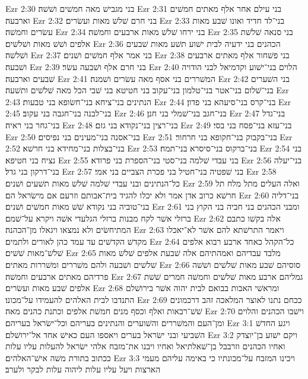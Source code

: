 Ezr 2:30  בני מגבישׁ מאה חמשׁים ושׁשׁה׃
Ezr 2:31  בני עילם אחר אלף מאתים חמשׁים וארבעה׃
Ezr 2:32  בני חרם שׁלשׁ מאות ועשׂרים׃
Ezr 2:33  בני־לד חדיד ואונו שׁבע מאות עשׂרים וחמשׁה׃
Ezr 2:34  בני ירחו שׁלשׁ מאות ארבעים וחמשׁה׃
Ezr 2:35  בני סנאה שׁלשׁת אלפים ושׁשׁ מאות ושׁלשׁים׃
Ezr 2:36  הכהנים בני ידעיה לבית ישׁוע תשׁע מאות שׁבעים ושׁלשׁה׃
Ezr 2:37  בני אמר אלף חמשׁים ושׁנים׃
Ezr 2:38  בני פשׁחור אלף מאתים ארבעים ושׁבעה׃
Ezr 2:39  בני חרם אלף ושׁבעה עשׂר׃
Ezr 2:40  הלוים בני־ישׁוע וקדמיאל לבני הודויה שׁבעים וארבעה׃
Ezr 2:41  המשׁררים בני אסף מאה עשׂרים ושׁמנה׃
Ezr 2:42  בני השׁערים בני־שׁלום בני־אטר בני־טלמון בני־עקוב בני חטיטא בני שׁבי הכל מאה שׁלשׁים ותשׁעה׃
Ezr 2:43  הנתינים בני־ציחא בני־חשׂופא בני טבעות׃
Ezr 2:44  בני־קרס בני־סיעהא בני פדון׃
Ezr 2:45  בני־לבנה בני־חגבה בני עקוב׃
Ezr 2:46  בני־חגב בני־שׁמלי בני חנן׃
Ezr 2:47  בני־גדל בני־גחר בני ראיה׃
Ezr 2:48  בני־רצין בני־נקודא בני גזם׃
Ezr 2:49  בני־עזא בני־פסח בני בסי׃
Ezr 2:50  בני־אסנה בני־מעינים בני נפיסים׃
Ezr 2:51  בני־בקבוק בני־חקופא בני חרחור׃
Ezr 2:52  בני־בצלות בני־מחידא בני חרשׁא׃
Ezr 2:53  בני־ברקוס בני־סיסרא בני־תמח׃
Ezr 2:54  בני נציח בני חטיפא׃
Ezr 2:55  בני עבדי שׁלמה בני־סטי בני־הספרת בני פרודא׃
Ezr 2:56  בני־יעלה בני־דרקון בני גדל׃
Ezr 2:57  בני שׁפטיה בני־חטיל בני פכרת הצביים בני אמי׃
Ezr 2:58  כל־הנתינים ובני עבדי שׁלמה שׁלשׁ מאות תשׁעים ושׁנים׃
Ezr 2:59  ואלה העלים מתל מלח תל חרשׁא כרוב אדן אמר ולא יכלו להגיד בית־אבותם וזרעם אם מישׂראל הם׃
Ezr 2:60  בני־דליה בני־טוביה בני נקודא שׁשׁ מאות חמשׁים ושׁנים׃
Ezr 2:61  ומבני הכהנים בני חביה בני הקוץ בני ברזלי אשׁר לקח מבנות ברזלי הגלעדי אשׁה ויקרא על־שׁמם׃
Ezr 2:62  אלה בקשׁו כתבם המתיחשׂים ולא נמצאו ויגאלו מן־הכהנה׃
Ezr 2:63  ויאמר התרשׁתא להם אשׁר לא־יאכלו מקדשׁ הקדשׁים עד עמד כהן לאורים ולתמים׃
Ezr 2:64  כל־הקהל כאחד ארבע רבוא אלפים שׁלשׁ־מאות שׁשׁים׃
Ezr 2:65  מלבד עבדיהם ואמהתיהם אלה שׁבעת אלפים שׁלשׁ מאות שׁלשׁים ושׁבעה ולהם משׁררים ומשׁררות מאתים׃
Ezr 2:66  סוסיהם שׁבע מאות שׁלשׁים ושׁשׁה פרדיהם מאתים ארבעים וחמשׁה׃
Ezr 2:67  גמליהם ארבע מאות שׁלשׁים וחמשׁה חמרים שׁשׁת אלפים שׁבע מאות ועשׂרים׃
Ezr 2:68  ומראשׁי האבות בבואם לבית יהוה אשׁר בירושׁלם התנדבו לבית האלהים להעמידו על־מכונו׃
Ezr 2:69  ככחם נתנו לאוצר המלאכה זהב דרכמונים שׁשׁ־רבאות ואלף וכסף מנים חמשׁת אלפים וכתנת כהנים מאה׃
Ezr 2:70  וישׁבו הכהנים והלוים ומן־העם והמשׁררים והשׁוערים והנתינים בעריהם וכל־ישׂראל בעריהם׃
Ezr 3:1  ויגע החדשׁ השׁביעי ובני ישׂראל בערים ויאספו העם כאישׁ אחד אל־ירושׁלם׃
Ezr 3:2  ויקם ישׁוע בן־יוצדק ואחיו הכהנים וזרבבל בן־שׁאלתיאל ואחיו ויבנו את־מזבח אלהי ישׂראל להעלות עליו עלות ככתוב בתורת משׁה אישׁ־האלהים׃
Ezr 3:3  ויכינו המזבח על־מכונתיו כי באימה עליהם מעמי הארצות ויעל עליו עלות ליהוה עלות לבקר ולערב׃
